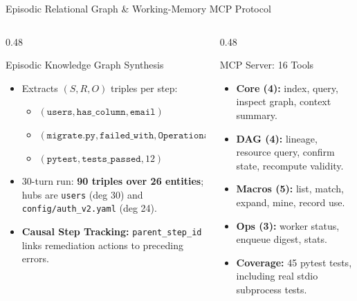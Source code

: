\documentclass[aspectratio=169,10pt]{beamer}
\begin{document}
\begin{frame}{Episodic Relational Graph \& Working-Memory MCP Protocol}
  \begin{columns}[T,onlytextwidth]
    \begin{column}{0.48\textwidth}
      \begin{block}{Episodic Knowledge Graph Synthesis}
        \begin{itemize}
          \footnotesize
          \item Extracts $(S, R, O)$ triples per step:
            \begin{itemize}
              \scriptsize
              \item $(\texttt{users}, \texttt{has\_column}, \texttt{email})$
              \item $(\texttt{migrate.py}, \texttt{failed\_with}, \texttt{OperationalError})$
              \item $(\texttt{pytest}, \texttt{tests\_passed}, 12)$
            \end{itemize}
          \item 30-turn run: \textbf{90 triples over 26 entities}; hubs are \texttt{users} (deg 30) and \texttt{config/auth\_v2.yaml} (deg 24).
          \item \textbf{Causal Step Tracking:} \texttt{parent\_step\_id} links remediation actions to preceding errors.
        \end{itemize}
      \end{block}
    \end{column}
    \begin{column}{0.48\textwidth}
      \begin{block}{MCP Server: 16 Tools}
        \begin{itemize}
          \footnotesize
          \item \textbf{Core (4):} index, query, inspect graph, context summary.
          \item \textbf{DAG (4):} lineage, resource query, confirm state, recompute validity.
          \item \textbf{Macros (5):} list, match, expand, mine, record use.
          \item \textbf{Ops (3):} worker status, enqueue digest, stats.
          \item \textbf{Coverage:} 45 pytest tests, including real stdio subprocess tests.
        \end{itemize}
      \end{block}
    \end{column}
  \end{columns}
\end{frame}
\end{document}
